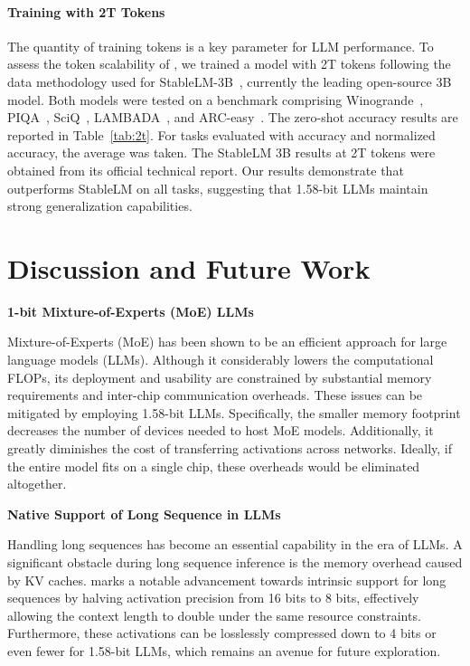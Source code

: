 \paragraph{Training with 2T Tokens}

The quantity of training tokens is a key parameter for LLM performance. To assess the token scalability of , we trained a model with 2T tokens following the data methodology used for StableLM-3B~\cite{StableLM-3B-4E1T}, currently the leading open-source 3B model. Both models were tested on a benchmark comprising Winogrande~\cite{winoGrande}, PIQA~\cite{piqa}, SciQ~\cite{sciq}, LAMBADA~\cite{lambada}, and ARC-easy~\cite{arc}. The zero-shot accuracy results are reported in Table~\ref{tab:2t}. For tasks evaluated with accuracy and normalized accuracy, the average was taken. The StableLM 3B results at 2T tokens were obtained from its official technical report. Our results demonstrate that  outperforms StableLM on all tasks, suggesting that 1.58-bit LLMs maintain strong generalization capabilities.

\section{Discussion and Future Work}

\textbf{1-bit Mixture-of-Experts (MoE) LLMs}

Mixture-of-Experts (MoE) has been shown to be an efficient approach for large language models (LLMs). Although it considerably lowers the computational FLOPs, its deployment and usability are constrained by substantial memory requirements and inter-chip communication overheads. These issues can be mitigated by employing 1.58-bit LLMs. Specifically, the smaller memory footprint decreases the number of devices needed to host MoE models. Additionally, it greatly diminishes the cost of transferring activations across networks. Ideally, if the entire model fits on a single chip, these overheads would be eliminated altogether.

\textbf{Native Support of Long Sequence in LLMs}

Handling long sequences has become an essential capability in the era of LLMs. A significant obstacle during long sequence inference is the memory overhead caused by KV caches.  marks a notable advancement towards intrinsic support for long sequences by halving activation precision from 16 bits to 8 bits, effectively allowing the context length to double under the same resource constraints. Furthermore, these activations can be losslessly compressed down to 4 bits or even fewer for 1.58-bit LLMs, which remains an avenue for future exploration.

